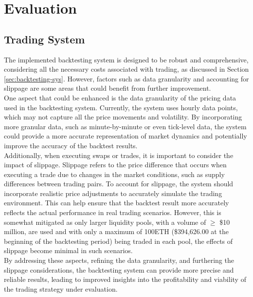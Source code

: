 \chapter{Evaluation}
\section{Trading System}
The implemented backtesting system is designed to be robust and comprehensive, considering all the necessary costs associated with trading, as discussed in Section \ref{sec:backtesting-sys}. However, factors such as data granularity and accounting for slippage are some areas that could benefit from further improvement.
\\[3mm]
One aspect that could be enhanced is the data granularity of the pricing data used in the backtesting system. Currently, the system uses hourly data points, which may not capture all the price movements and volatility. By incorporating more granular data, such as minute-by-minute or even tick-level data, the system could provide a more accurate representation of market dynamics and potentially improve the accuracy of the backtest results.
\\[3mm]
Additionally, when executing swaps or trades, it is important to consider the impact of slippage. Slippage refers to the price difference that occurs when executing a trade due to changes in the market conditions, such as supply differences between trading pairs. To account for slippage, the system should incorporate realistic price adjustments to accurately simulate the trading environment. This can help ensure that the backtest result more accurately reflects the actual performance in real trading scenarios. However, this is somewhat mitigated as only larger liquidity pools, with a volume of $\geq$ \$10 million, are used and with only a maximum of 100ETH (\$394,626.00 at the beginning of the backtesting period) being traded in each pool, the effects of slippage become minimal in such scenarios.
\\[3mm]
By addressing these aspects, refining the data granularity, and furthering the slippage considerations, the backtesting system can provide more precise and reliable results, leading to improved insights into the profitability and viability of the trading strategy under evaluation.

